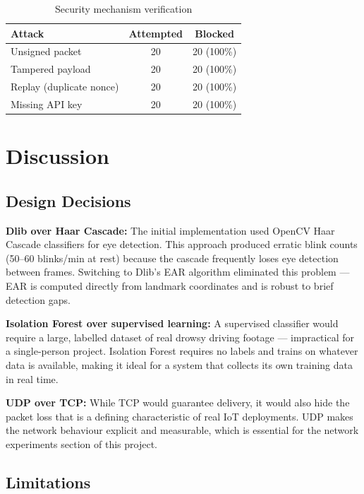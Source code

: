 \documentclass[12pt, a4paper]{article}
\begin{document}
\begin{table}[H]
\centering
\caption{Security mechanism verification}
\begin{tabular}{lcc}
\toprule
\textbf{Attack} & \textbf{Attempted} & \textbf{Blocked} \\
\midrule
Unsigned packet         & 20 & 20 (100\%) \\
Tampered payload        & 20 & 20 (100\%) \\
Replay (duplicate nonce) & 20 & 20 (100\%) \\
Missing API key         & 20 & 20 (100\%) \\
\bottomrule
\end{tabular}
\end{table}
\newpage
\section{Discussion}
\label{sec:discussion}

\subsection{Design Decisions}

\textbf{Dlib over Haar Cascade:}
The initial implementation used OpenCV Haar Cascade classifiers for eye detection.
This approach produced erratic blink counts (50--60 blinks/min at rest) because
the cascade frequently loses eye detection between frames. Switching to Dlib's
EAR algorithm eliminated this problem — EAR is computed directly from landmark
coordinates and is robust to brief detection gaps.

\textbf{Isolation Forest over supervised learning:}
A supervised classifier would require a large, labelled dataset of real drowsy
driving footage — impractical for a single-person project. Isolation Forest
requires no labels and trains on whatever data is available, making it ideal
for a system that collects its own training data in real time.

\textbf{UDP over TCP:}
While TCP would guarantee delivery, it would also hide the packet loss that
is a defining characteristic of real IoT deployments. UDP makes the network
behaviour explicit and measurable, which is essential for the network
experiments section of this project.

\subsection{Limitations}
\end{document}
